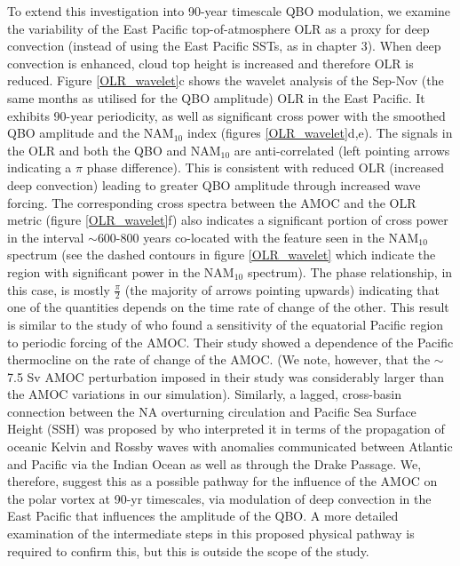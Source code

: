 To extend this investigation into 90-year timescale QBO modulation, we examine the variability of the East Pacific top-of-atmosphere OLR as a proxy for deep convection (instead of using the East Pacific SSTs, as in chapter 3). When deep convection is enhanced, cloud top height is increased and therefore OLR is reduced. Figure \ref{OLR_wavelet}c shows the wavelet analysis of the Sep-Nov (the same months as utilised for the QBO amplitude) OLR in the East Pacific. It exhibits 90-year periodicity, as well as significant cross power with the smoothed QBO amplitude and the NAM$_{10}$ index (figures \ref{OLR_wavelet}d,e). The signals in the OLR and both the QBO and NAM$_{10}$ are anti-correlated (left pointing arrows indicating a $\pi$ phase difference). This is consistent with reduced OLR (increased deep convection) leading to greater QBO amplitude through increased wave forcing.  The corresponding cross spectra between the AMOC and the OLR metric (figure \ref{OLR_wavelet}f) also indicates a significant portion of cross power in the interval $\sim$600-800 years co-located with the feature seen in the NAM$_{10}$ spectrum (see the dashed contours in figure \ref{OLR_wavelet} which indicate the region with  significant power in the NAM$_{10}$ spectrum). The phase relationship, in this case, is mostly $\frac{\pi}{2}$ (the majority of arrows pointing upwards) indicating that one of the quantities depends on the time rate of change of the other. This result is similar to the study of \cite{timmermannENSO2005d} who found a sensitivity of the equatorial Pacific region to periodic forcing of the AMOC. Their study showed a dependence of the Pacific thermocline on the rate of change of the AMOC. (We note, however, that the $\sim$7.5 Sv AMOC perturbation imposed in their study was considerably larger than the AMOC variations in our simulation). Similarly, a lagged, cross-basin connection between the NA overturning circulation and Pacific Sea Surface Height (SSH) was proposed by \cite{cessiGlobal2004} who interpreted it in terms of the propagation of oceanic Kelvin and Rossby waves with anomalies communicated between Atlantic and Pacific via the Indian Ocean as well as through the Drake Passage. We, therefore, suggest this as a possible pathway for the influence of the AMOC on the polar vortex at 90-yr timescales, via modulation of deep convection in the East Pacific that influences the amplitude of the QBO. A more detailed examination of the intermediate steps in this proposed physical pathway is required to confirm this, but this is outside the scope of the study.  

